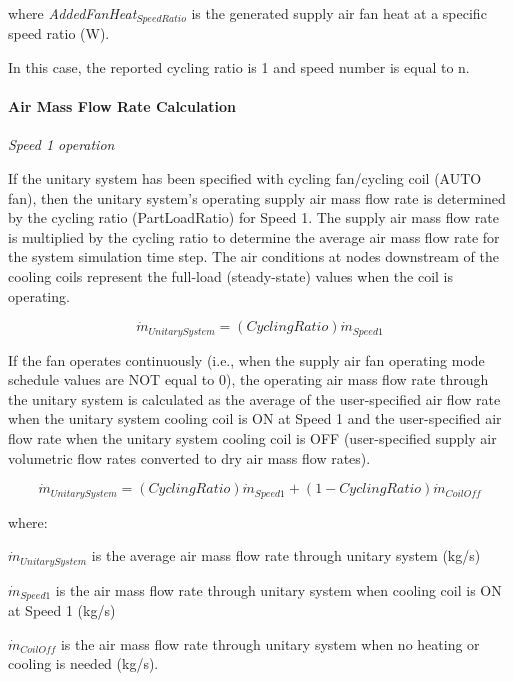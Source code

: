 where \emph{AddedFanHeat\(_{SpeedRatio}\)} is the generated supply air fan heat at a specific speed ratio (W).

In this case, the reported cycling ratio is 1 and speed number is equal to n.

\paragraph{Air Mass Flow Rate Calculation}\label{air-mass-flow-rate-calculation}

\emph{Speed 1 operation}

If the unitary system has been specified with cycling fan/cycling coil (AUTO fan), then the unitary system's operating supply air mass flow rate is determined by the cycling ratio (PartLoadRatio) for Speed 1. The supply air mass flow rate is multiplied by the cycling ratio to determine the average air mass flow rate for the system simulation time step. The air conditions at nodes downstream of the cooling coils represent the full-load (steady-state) values when the coil is operating.

\begin{equation}
\dot{m}_{UnitarySystem} = \left( {CyclingRatio} \right)\dot{m}_{Speed1}
\end{equation}

If the fan operates continuously (i.e., when the supply air fan operating mode schedule values are NOT equal to 0), the operating air mass flow rate through the unitary system is calculated as the average of the user-specified air flow rate when the unitary system cooling coil is ON at Speed 1 and the user-specified air flow rate when the unitary system cooling coil is OFF (user-specified supply air volumetric flow rates converted to dry air mass flow rates).

\begin{equation}
{\dot{m}_{UnitarySystem}} = \left( {CyclingRatio} \right){\dot{m}_{Speed1}} + \left( {1 - CyclingRatio} \right){\dot{m}_{CoilOff}}
\end{equation}

where:

\({\dot m_{UnitarySystem}}\) is the average air mass flow rate through unitary system (kg/s)

\({\dot m_{Speed1}}\) is the air mass flow rate through unitary system when cooling coil is ON at Speed 1 (kg/s)

\({\dot m_{CoilOff}}\) is the air mass flow rate through unitary system when no heating or cooling is needed (kg/s).

